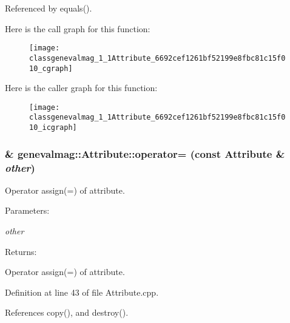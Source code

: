 Referenced by equals().

Here is the call graph for this function:\nopagebreak
\begin{figure}[H]
\begin{center}
\leavevmode
\texttt{[image: classgenevalmag\_1\_1Attribute\_6692cef1261bf52199e8fbc81c15f010\_cgraph]}
\end{center}
\end{figure}


Here is the caller graph for this function:\nopagebreak
\begin{figure}[H]
\begin{center}
\leavevmode
\texttt{[image: classgenevalmag\_1\_1Attribute\_6692cef1261bf52199e8fbc81c15f010\_icgraph]}
\end{center}
\end{figure}
\hypertarget{classgenevalmag_1_1Attribute_ac5ff69cd1074e47a7794db8c65bff42}{
\subsubsection[{operator=}]{ \& genevalmag::Attribute::operator= (const {\bf Attribute} \& {\em other})}}
\label{classgenevalmag_1_1Attribute_ac5ff69cd1074e47a7794db8c65bff42}


Operator assign(=) of attribute. \begin{Desc}
\item[Parameters:]
\begin{description}
\item[{\em other}]\end{description}
\end{Desc}
\begin{Desc}
\item[Returns:]\end{Desc}
Operator assign(=) of attribute. 

Definition at line 43 of file Attribute.cpp.

References copy(), and destroy().


